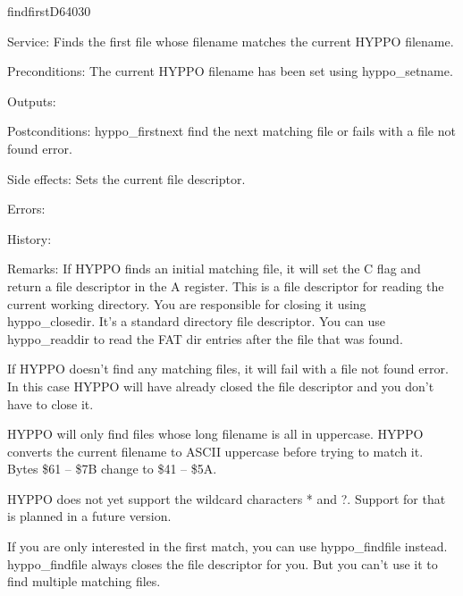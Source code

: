 %
\newpage
\begin{hyppotrap}{findfirst}{D640}{30}
\item [Service:]
  Finds the first file whose filename matches the current HYPPO filename.
\item [Preconditions:]
  The current HYPPO filename has been set using hyppo\_setname.
\item [Outputs:]
\item [Postconditions:]
  hyppo\_firstnext find the next matching file or fails with a file not found
  error.
\item [Side effects:]
  Sets the current file descriptor.
\item [Errors:]
\item [History:]
\item [Remarks:]
  If HYPPO finds an initial matching file, it will set the C flag and
  return a file descriptor in the A register. This is a file descriptor for
  reading the current working directory. You are responsible for closing it
  using hyppo\_closedir. It's a standard directory file descriptor. You can use
  hyppo\_readdir to read the FAT dir entries after the file that was found.

  If HYPPO doesn't find any matching files, it will fail with a file
  not found error. In this case HYPPO will have already closed the
  file descriptor and you don't have to close it.

  HYPPO will only find files whose long filename is all in uppercase.
  HYPPO converts the current filename to ASCII uppercase before trying
  to match it. Bytes \$61 -- \$7B change to \$41 -- \$5A.

  HYPPO does not yet support the wildcard characters * and ?. Support
  for that is planned in a future version.

  If you are only interested in the first match, you can use hyppo\_findfile
  instead. hyppo\_findfile always closes the file descriptor for you. But you
  can't use it to find multiple matching files.
\end{hyppotrap}


